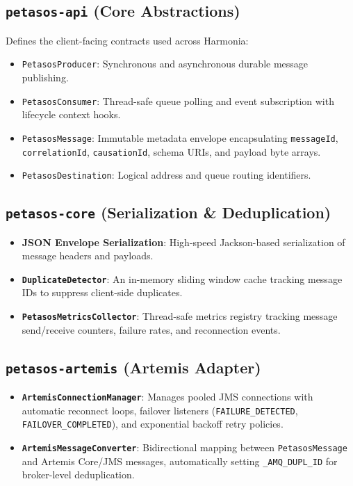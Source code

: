 \subsection{\texttt{petasos-api} (Core Abstractions)}
Defines the client-facing contracts used across Harmonia:
\begin{itemize}
    \item \texttt{PetasosProducer}: Synchronous and asynchronous durable message publishing.
    \item \texttt{PetasosConsumer}: Thread-safe queue polling and event subscription with lifecycle context hooks.
    \item \texttt{PetasosMessage}: Immutable metadata envelope encapsulating \texttt{messageId}, \texttt{correlationId}, \texttt{causationId}, schema URIs, and payload byte arrays.
    \item \texttt{PetasosDestination}: Logical address and queue routing identifiers.
\end{itemize}

\subsection{\texttt{petasos-core} (Serialization \& Deduplication)}
\begin{itemize}
    \item \textbf{JSON Envelope Serialization}: High-speed Jackson-based serialization of message headers and payloads.
    \item \textbf{\texttt{DuplicateDetector}}: An in-memory sliding window cache tracking message IDs to suppress client-side duplicates.
    \item \textbf{\texttt{PetasosMetricsCollector}}: Thread-safe metrics registry tracking message send/receive counters, failure rates, and reconnection events.
\end{itemize}

\subsection{\texttt{petasos-artemis} (Artemis Adapter)}
\begin{itemize}
    \item \textbf{\texttt{ArtemisConnectionManager}}: Manages pooled JMS connections with automatic reconnect loops, failover listeners (\texttt{FAILURE\_DETECTED}, \texttt{FAILOVER\_COMPLETED}), and exponential backoff retry policies.
    \item \textbf{\texttt{ArtemisMessageConverter}}: Bidirectional mapping between \texttt{PetasosMessage} and Artemis Core/JMS messages, automatically setting \texttt{\_AMQ\_DUPL\_ID} for broker-level deduplication.
\end{itemize}

